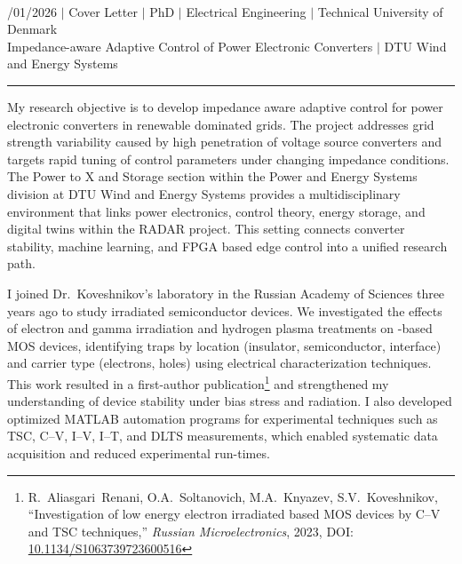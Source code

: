 \documentclass[a4paper,12pt]{article}
\begin{document}
{\centering
  {\scshape {}} \\ 
  {\fontsize{10}{10}/01/2026} $|$
  {\fontsize{10}{10}\selectfont Cover Letter} $|$
  {\fontsize{10}{10}\selectfont PhD} $|$
  {\fontsize{10}{10}\selectfont Electrical Engineering} $|$
  {\fontsize{10}{10}\selectfont Technical University of Denmark} \\
  {\fontsize{10}{10}\selectfont Impedance-aware Adaptive Control of Power
  Electronic Converters} $|$
  {\fontsize{10}{10}\selectfont DTU Wind and Energy Systems}
\par}
\vspace{-15pt}
\noindent\rule{\textwidth}{0.5pt}

\vspace{-5pt}

My research objective is to develop impedance aware adaptive control for power electronic converters in renewable dominated grids. The project addresses grid strength variability caused by high penetration of voltage source converters and targets rapid tuning of control parameters under changing impedance conditions. The Power to X and Storage section within the Power and Energy Systems division at DTU Wind and Energy Systems provides a multidisciplinary environment that links power electronics, control theory, energy storage, and digital twins within the RADAR project. This setting connects converter stability, machine learning, and FPGA based edge control into a unified research path.

I joined Dr.\ Koveshnikov's laboratory in the Russian Academy of Sciences three years ago to study irradiated semiconductor devices. We investigated the effects of electron and gamma irradiation and hydrogen plasma treatments on -based MOS devices, identifying traps by location (insulator, semiconductor, interface) and carrier type (electrons, holes) using electrical characterization techniques. This work resulted in a first-author publication\footnote{R.~Aliasgari~Renani, O.A.~Soltanovich, M.A.~Knyazev, S.V.~Koveshnikov, ``Investigation of low energy electron irradiated  based MOS devices by C--V and TSC techniques,'' \textit{Russian Microelectronics}, 2023, DOI: \href{https://doi.org/10.1134/S1063739723600516}{10.1134/S1063739723600516}} and strengthened my understanding of device stability under bias stress and radiation. I also developed optimized MATLAB automation programs for experimental techniques such as TSC, C--V, I--V, I--T, and DLTS measurements, which enabled systematic data acquisition and reduced experimental run-times.
\end{document}

